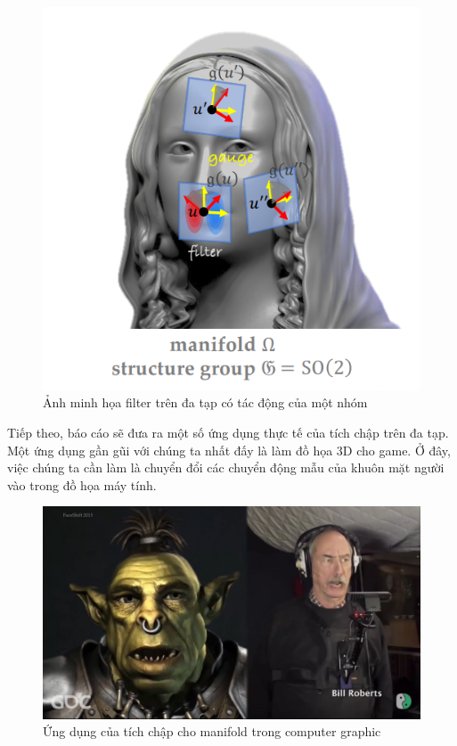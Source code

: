 \begin{figure}[H]
    \centering
    \includegraphics[width=1\linewidth]{Images/GDL/manifold_mesh/mani_cnn/mani_cnn.png}
    \caption{Ảnh minh họa filter trên đa tạp có tác động của một nhóm\cite{geometricdeep2022}}
\end{figure}

Tiếp theo, báo cáo sẽ đưa ra một số ứng dụng thực tế của tích chập trên đa tạp. Một ứng dụng gần gũi với chúng ta nhất đấy là làm đồ họa 3D cho game. Ở đây, việc chúng ta cần làm là chuyển đổi các chuyển động mẫu của khuôn mặt người vào trong đồ họa máy tính.

\begin{figure}[H]
    \centering
    \includegraphics[width=1\linewidth]{Images/GDL/manifold_mesh/mani_cnn/app_mani.png}
    \caption{Ứng dụng của tích chập cho manifold trong computer graphic\cite{geometricdeep2022}}
\end{figure}

